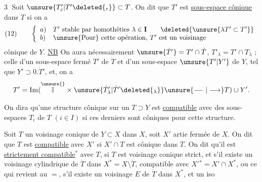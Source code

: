 \textcircled{3} Soit
 $\unsure{T'_\varepsilon|T'\deleted{_\varepsilon}}\subset T$.
On dit que $T'$ est \uline{sous-espace cônique} dans $T$ si on a
\[
(12)\qquad\left\{\begin{array}{ll}
a)&T'\text{ stable par homothéties }\lambda\in\mathbf{I}\qquad
\deleted{\unsure{\lambda T'\subset T'}}\\
b)&\text{\unsure{Pour} cette opération, }T'\text{ est un voisinage}
\end{array}\right.
\]
 cônique de $Y$.
\uline{NB} On aura nécessairement $\unsure{\dot T'}=T'\cap\dot T$,
$T'_\lambda=T'\cap T_\lambda$ ;
celle d'un sous-espace fermé $\dot T'$ de $\dot T$
et d'un sous-espace $\unsure{T'|Y'}$ de $Y$, tel que $Y'\supset0.\dot T'$, et,
on a
\[
T'=\operatorname{Im}(\overset{\unsure{}}{\mathbb{I}}\times
\unsure{\dot T'_\lambda|\dot T'\deleted{_\lambda}}
\unsure{\mathrel{\relbar\joinrel\relbar}|\longrightarrow}T)\cup Y'.
\]

On dira qu'une structure cônique sur
un $T\supset Y$ est \uline{compatible} avec des sous-espaces
 $T_i$ de $T$ $(i\in I)$ si ces derniers
sont côniques pour cette structure.

Soit $T$ un voisinage conique de $Y\subset X$
dans $X$, soit $X'$ artie fermée de $X$. On
dit que $T$ est \uline{compatible} avec $X'$ si
$X'\cap T$ est cônique dans $T$. On dit qu'il
est \uline{strictement compatible}$^{*}$ avec $T$, si
$T$ est voisinage conique strict, et s'il existe
un voisinage cylindrique de $\dot T$ dans
$X^*=X\setminus\mathring T$, compatible avec
$X'{}^*=X'\cap X^*$,
ou ce qui revient au $=$, s'il existe un
voisinage $E$ de $\dot T$ dans $X^*$, et un iso
